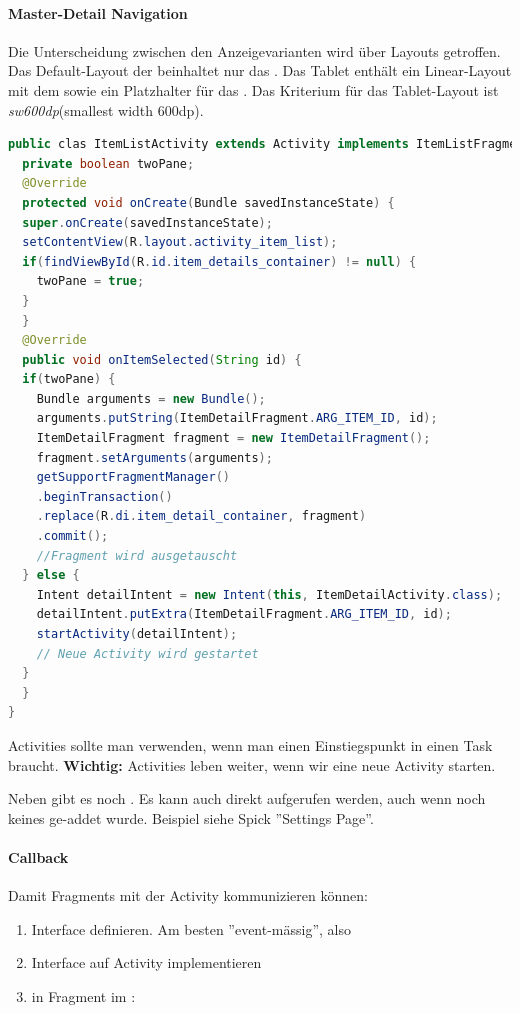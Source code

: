 \paragraph{Master-Detail Navigation} Die Unterscheidung zwischen den Anzeigevarianten wird über Layouts getroffen. Das Default-Layout der  beinhaltet nur das . Das Tablet enthält ein Linear-Layout mit dem  sowie ein Platzhalter für das . Das Kriterium für das Tablet-Layout ist \textit{sw600dp}(smallest width 600dp).
\begin{lstlisting}[language=java]
public clas ItemListActivity extends Activity implements ItemListFragment.Callbacks {
  private boolean twoPane;
  @Override
  protected void onCreate(Bundle savedInstanceState) {
  super.onCreate(savedInstanceState);
  setContentView(R.layout.activity_item_list);
  if(findViewById(R.id.item_details_container) != null) {
    twoPane = true;
  }
  }
  @Override
  public void onItemSelected(String id) {
  if(twoPane) {
    Bundle arguments = new Bundle();
    arguments.putString(ItemDetailFragment.ARG_ITEM_ID, id);
    ItemDetailFragment fragment = new ItemDetailFragment();
    fragment.setArguments(arguments);
    getSupportFragmentManager()
    .beginTransaction()
    .replace(R.di.item_detail_container, fragment)
    .commit();
    //Fragment wird ausgetauscht
  } else {
    Intent detailIntent = new Intent(this, ItemDetailActivity.class);
    detailIntent.putExtra(ItemDetailFragment.ARG_ITEM_ID, id);
    startActivity(detailIntent);
    // Neue Activity wird gestartet
  }
  }
}
\end{lstlisting}
Activities sollte man verwenden, wenn man einen Einstiegspunkt in einen Task braucht. \textbf{Wichtig:} Activities leben weiter, wenn wir eine neue Activity starten.

Neben  gibt es noch . Es kann auch direkt  aufgerufen werden, auch wenn noch keines ge-addet wurde. Beispiel siehe Spick ''Settings Page''.

\paragraph{Callback}
Damit Fragments mit der Activity kommunizieren können:
\begin{enumerate}
  \item Interface definieren. Am besten ''event-mässig'', also 
  \item Interface auf Activity implementieren
  \item in Fragment im :\\ 
\end{enumerate}

